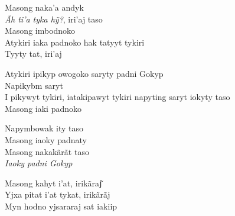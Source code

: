 \bigskip

\begin{linenumbers}\begingroup\raggedright
\noindent Masong naka'a andyk\\
\textit{Ãh ti'a tyka hỹ?}, iri'aj taso\\
Masong imbodnoko\\
Atykiri iaka padnoko hak tatyyt tykiri\\
Tyyty tat, iri'aj
\end{linenumbers}\endgroup

\bigskip

\begin{linenumbers}\begingroup\raggedright
\noindent Atykiri ipikyp owogoko saryty padni Gokyp\\
Napikybm saryt\\
I pikywyt tykiri, iatakipawyt tykiri napyting saryt iokyty taso\\
Masong iaki padnoko
\end{linenumbers}\endgroup

\bigskip

\begin{linenumbers}\begingroup\raggedright
\noindent Napymbowak ity taso\\
Masong iaoky padnaty\\
Masong nakakãrãt taso\\
\textit{Iaoky padni Gokyp}
\end{linenumbers}\endgroup

\bigskip

\begin{linenumbers}\begingroup\raggedright
\noindent Masong kahyt i'at, irikãraj͂\\
Yjxa pitat i'at tykat, irikãrãj\\
Myn hodno yjsararaj sat iakiip
\end{linenumbers}\endgroup

